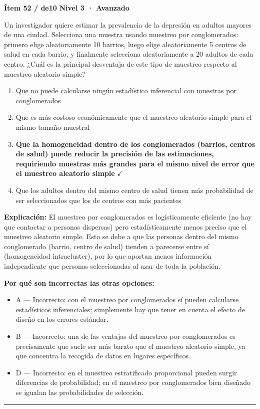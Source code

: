 \documentclass[12pt,a4paper]{article}
\begin{document}
\begin{mdframed}[backgroundcolor=fondogris,linecolor=rojo,linewidth=1pt,innerleftmargin=10pt,innerrightmargin=10pt,innertopmargin=7pt,innerbottommargin=7pt]
\textbf{Ítem 52 / de10} \hfill {\small\bfseries\color{rojo} Nivel 3 · Avanzado}
\end{mdframed}

Un investigador quiere estimar la prevalencia de la depresión en adultos mayores de una ciudad. Selecciona una muestra usando muestreo por conglomerados: primero elige aleatoriamente 10 barrios, luego elige aleatoriamente 5 centros de salud en cada barrio, y finalmente selecciona aleatoriamente a 20 adultos de cada centro. ¿Cuál es la principal desventaja de este tipo de muestreo respecto al muestreo aleatorio simple?

\begin{enumerate}
  \item[A.] Que no puede calcularse ningún estadístico inferencial con muestras por conglomerados
  \item[B.] Que es más costoso económicamente que el muestreo aleatorio simple para el mismo tamaño muestral
  \item[\textbf{\color{verde}C.}] \textbf{\color{verde} Que la homogeneidad dentro de los conglomerados (barrios, centros de salud) puede reducir la precisión de las estimaciones, requiriendo muestras más grandes para el mismo nivel de error que el muestreo aleatorio simple} \hfill $\checkmark$
  \item[D.] Que los adultos dentro del mismo centro de salud tienen más probabilidad de ser seleccionados que los de centros con más pacientes
\end{enumerate}

\noindent\textbf{\color{azul}Explicación:} El muestreo por conglomerados es logísticamente eficiente (no hay que contactar a personas dispersas) pero estadísticamente menos preciso que el muestreo aleatorio simple. Esto se debe a que las personas dentro del mismo conglomerado (barrio, centro de salud) tienden a parecerse entre sí (homogeneidad intracluster), por lo que aportan menos información independiente que personas seleccionadas al azar de toda la población.

\noindent\textbf{\color{gris}Por qué son incorrectas las otras opciones:}
\begin{itemize}
  \item {\small A — Incorrecto: con el muestreo por conglomerados sí pueden calcularse estadísticos inferenciales; simplemente hay que tener en cuenta el efecto de diseño en los errores estándar.}
  \item {\small B — Incorrecto: una de las ventajas del muestreo por conglomerados es precisamente que suele ser más barato que el muestreo aleatorio simple, ya que concentra la recogida de datos en lugares específicos.}
  \item {\small D — Incorrecto: en el muestreo estratificado proporcional pueden surgir diferencias de probabilidad; en el muestreo por conglomerados bien diseñado se igualan las probabilidades de selección.}
\end{itemize}
\vspace{8pt}\hrule\vspace{10pt}
\end{document}
